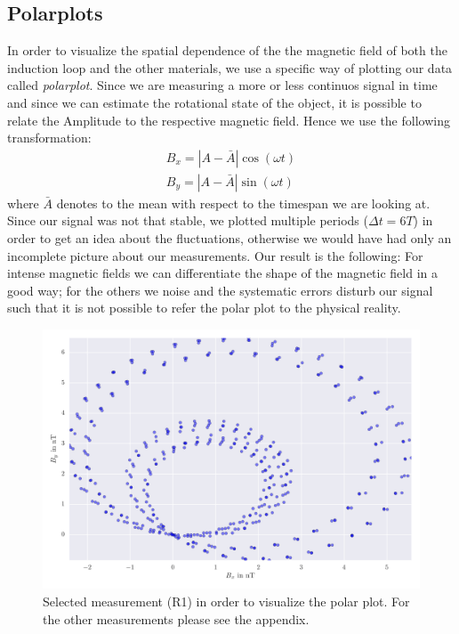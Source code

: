 \subsection{Polarplots}
In order to visualize the spatial dependence of the the magnetic field of both the 
induction loop and the other materials, we use a specific way of plotting 
our data called \textit{polarplot}. Since we are measuring a more or less
continuos signal in time and since we can estimate the rotational state
of the object, it is possible to relate the Amplitude to the respective magnetic
field. Hence we use the following transformation:
\begin{align}
B_x = |A - \bar{A}| \cos(\omega t) \\
B_y = |A - \bar{A}| \sin(\omega t) 
\end{align}
where $\bar{A}$ denotes to the mean with respect to the timespan we are looking at.
Since our signal was not that stable, we plotted multiple periods ($\Delta t = 6T$) in 
order to get an idea about the fluctuations, otherwise we would have had only
an incomplete picture about our measurements. Our result is the following:
For intense magnetic fields we can differentiate the shape of the magnetic field
in a good way; for the others we noise and the systematic errors disturb our
signal such that it is not possible to refer the polar plot to the physical reality. 
\begin{figure}[H]
    \centering
    \includegraphics[width=1\linewidth]{analysis/figures/polar4_1}
    \caption{Selected measurement (R1) in order to visualize the polar plot.
    For the other measurements please see the appendix.}
    \label{fig:4_1_polar}
\end{figure}


